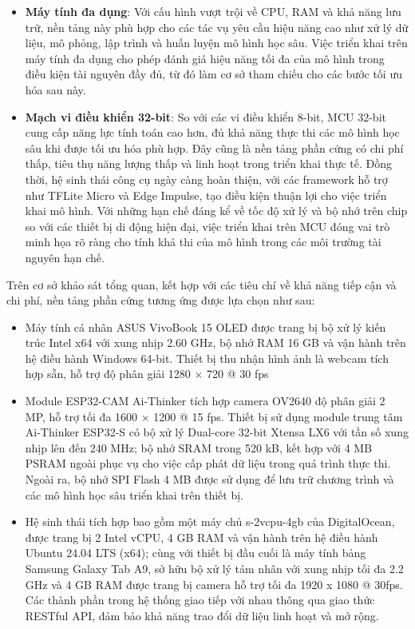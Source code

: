 \begin{itemize}
    \item \textbf{Máy tính đa dụng}: Với cấu hình vượt trội về CPU, RAM và khả năng lưu trữ, nền tảng này phù hợp cho các tác vụ yêu cầu hiệu năng cao như xử lý dữ liệu, mô phỏng, lập trình và huấn luyện mô hình học sâu. Việc triển khai trên máy tính đa dụng cho phép đánh giá hiệu năng tối đa của mô hình trong điều kiện tài nguyên đầy đủ, từ đó làm cơ sở tham chiếu cho các bước tối ưu hóa sau này.
    
    \item \textbf{Mạch vi điều khiển 32-bit}: So với các vi điều khiển 8-bit, MCU 32-bit cung cấp năng lực tính toán cao hơn, đủ khả năng thực thi các mô hình học sâu khi được tối ưu hóa phù hợp. Đây cũng là nền tảng phần cứng có chi phí thấp, tiêu thụ năng lượng thấp và linh hoạt trong triển khai thực tế. Đồng thời, hệ sinh thái công cụ ngày càng hoàn thiện, với các framework hỗ trợ như TFLite Micro và Edge Impulse, tạo điều kiện thuận lợi cho việc triển khai mô hình. Với những hạn chế đáng kể về tốc độ xử lý và bộ nhớ trên chip so với các thiết bị di động hiện đại, việc triển khai trên MCU đóng vai trò minh họa rõ ràng cho tính khả thi của mô hình trong các môi trường tài nguyên hạn chế.
\end{itemize}
Trên cơ sở khảo sát tổng quan, kết hợp với các tiêu chí về khả năng tiếp cận và chi phí, nền tảng phần cứng tương ứng được lựa chọn như sau:
\begin{itemize}
    \item Máy tính cá nhân ASUS VivoBook 15 OLED\cite{asus_2023_asus} được trang bị bộ xử lý kiến trúc Intel x64 với xung nhịp 2.60 GHz, bộ nhớ RAM 16 GB và vận hành trên hệ điều hành Windows 64-bit. Thiết bị thu nhận hình ảnh là webcam tích hợp sẵn, hỗ trợ độ phân giải 1280 × 720 @ 30 fps
    \item Module ESP32-CAM Ai-Thinker\cite{aithinker_2020_esp32cam} tích hợp camera OV2640 độ phân giải 2 MP, hỗ trợ tối đa 1600 × 1200 @ 15 fps. Thiết bị sử dụng module trung tâm Ai-Thinker ESP32-S có bộ xử lý Dual-core 32-bit Xtensa LX6 với tần số xung nhịp lên đến 240 MHz; bộ nhớ SRAM trong 520 kB, kết hợp với 4 MB PSRAM ngoài phục vụ cho việc cấp phát dữ liệu trong quá trình thực thi. Ngoài ra, bộ nhớ SPI Flash 4 MB được sử dụng để lưu trữ chương trình và các mô hình học sâu triển khai trên thiết bị.
     \item Hệ sinh thái tích hợp bao gồm một máy chủ s-2vcpu-4gb của DigitalOcean\cite{digitalocean_2026_digitalocean}, được trang bị 2 Intel vCPU, 4 GB RAM và vận hành trên hệ điều hành Ubuntu 24.04 LTS (x64); cùng với thiết bị đầu cuối là máy tính bảng Samsung Galaxy Tab A9\cite{samsung_2023_galaxy}, sở hữu bộ xử lý tám nhân với xung nhịp tối đa 2.2 GHz và 4 GB RAM được trang bị camera hỗ trợ tối đa 1920 x 1080 @ 30fps. Các thành phần trong hệ thống giao tiếp với nhau thông qua giao thức RESTful API, đảm bảo khả năng trao đổi dữ liệu linh hoạt và mở rộng.
\end{itemize}
